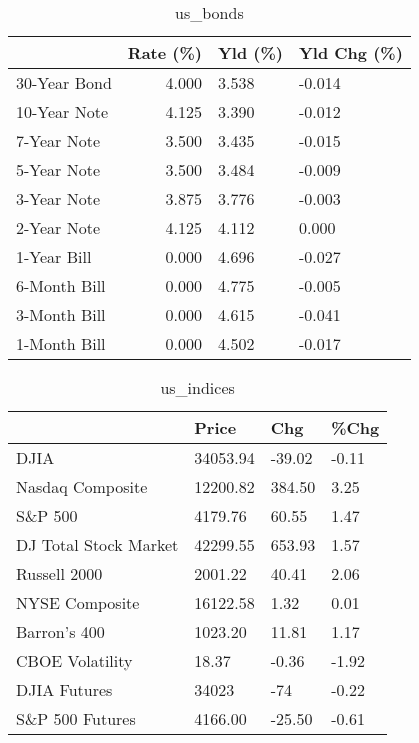 \documentclass{article}%
\begin{document}
\begin{table}[htbp]%
\caption{us\_bonds}%
\centering%
\begin{adjustbox}{width=1\textwidth}%
\begin{tabular}{lrll}
\toprule
             &  Rate (\%) & Yld (\%) & Yld Chg (\%) \\
\midrule
30-Year Bond &     4.000 &   3.538 &      -0.014 \\
10-Year Note &     4.125 &   3.390 &      -0.012 \\
 7-Year Note &     3.500 &   3.435 &      -0.015 \\
 5-Year Note &     3.500 &   3.484 &      -0.009 \\
 3-Year Note &     3.875 &   3.776 &      -0.003 \\
 2-Year Note &     4.125 &   4.112 &       0.000 \\
 1-Year Bill &     0.000 &   4.696 &      -0.027 \\
6-Month Bill &     0.000 &   4.775 &      -0.005 \\
3-Month Bill &     0.000 &   4.615 &      -0.041 \\
1-Month Bill &     0.000 &   4.502 &      -0.017 \\
\bottomrule
\end{tabular}
%
\end{adjustbox}%
\end{table}

%


\begin{table}[htbp]%
\caption{us\_indices}%
\centering%
\begin{adjustbox}{width=1\textwidth}%
\begin{tabular}{llll}
\toprule
                      &    Price &    Chg &  \%Chg \\
\midrule
                 DJIA & 34053.94 & -39.02 & -0.11 \\
     Nasdaq Composite & 12200.82 & 384.50 &  3.25 \\
              S\&P 500 &  4179.76 &  60.55 &  1.47 \\
DJ Total Stock Market & 42299.55 & 653.93 &  1.57 \\
         Russell 2000 &  2001.22 &  40.41 &  2.06 \\
       NYSE Composite & 16122.58 &   1.32 &  0.01 \\
         Barron's 400 &  1023.20 &  11.81 &  1.17 \\
      CBOE Volatility &    18.37 &  -0.36 & -1.92 \\
         DJIA Futures &    34023 &    -74 & -0.22 \\
      S\&P 500 Futures &  4166.00 & -25.50 & -0.61 \\
\bottomrule
\end{tabular}
%
\end{adjustbox}%
\end{table}
\end{document}
